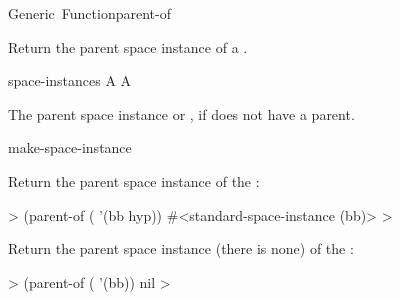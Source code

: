 \documentclass[10pt,twoside,english,pdftex]{article}
\begin{document}
\begin{functiondoc}{Generic~Function}{parent-of}%
  {
    }
%

\fnsyntax

\fnpurpose Return the parent space instance of a .

\fnmethods
{}%
  {\code{(} 
    \returns{} }

\fnpackage {}

\fnmodule {}

\fnargs
\begin{args}{space-instances}
 A 
 A 
\end{args}

\fnreturns The parent space instance or \nil, if  does not
have a parent.

\begin{alsos}{make-space-instance}
\also[children-of]
\end{alsos}

\fnexamples {}%
%
Return the parent space instance of the 
:
%
\W\supp
\begin{example}
  > (parent-of ( '(bb hyp))
  #<standard-space-instance (bb)>
  >
\end{example}
%
Return the parent space instance (there is none) of
the  :
%
\W\supp\notpretop
\begin{example}
  > (parent-of ( '(bb))
  nil
  >
\end{example}

\end{functiondoc}

\end{document}
